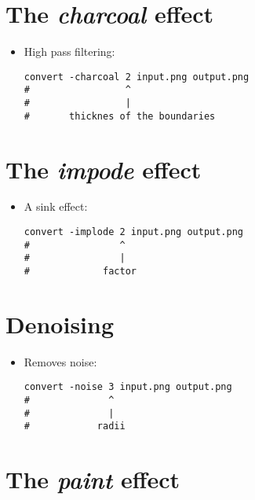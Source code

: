 
\section{The \emph{charcoal} effect}

\begin{itemize}
\item High pass filtering:
\begin{lstlisting}
convert -charcoal 2 input.png output.png
#                 ^
#                 |
#       thicknes of the boundaries
\end{lstlisting}

\end{itemize}


\section{The \emph{impode} effect}

\begin{itemize}
\item A sink effect:
\begin{lstlisting}
convert -implode 2 input.png output.png
#                ^
#                |
#             factor
\end{lstlisting}

\end{itemize}

\section{Denoising}

\begin{itemize}
\item Removes noise:
\begin{lstlisting}
convert -noise 3 input.png output.png
#              ^
#              |
#            radii
\end{lstlisting}

\end{itemize}


\section{The \emph{paint} effect}


